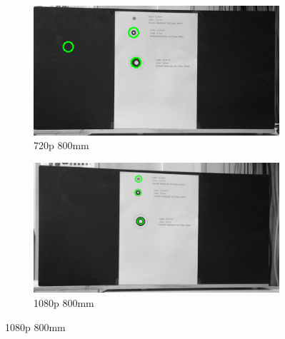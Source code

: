 \begin{figure}
    \begin{subfigure}[b]{.45\linewidth}
        \includegraphics[width=\linewidth]{bilder/project/720p800mm.png}
        \caption{720p 800mm}\label{fig:720p800mm}
    \end{subfigure}
    \begin{subfigure}[b]{.45\linewidth}
        \includegraphics[width=\linewidth]{bilder/project/1080p800mm.png}
        \caption{1080p 800mm}\label{fig:1080p800mm}
    \end{subfigure}



\end{figure}
